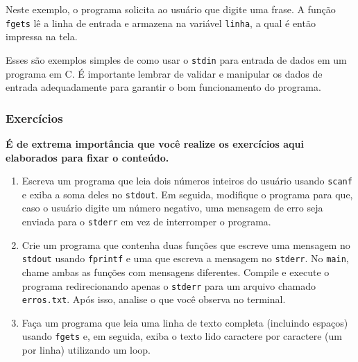Neste exemplo, o programa solicita ao usuário que digite uma frase. A função 
\texttt{fgets} lê a linha de entrada e armazena na variável \texttt{linha}, 
a qual é então impressa na tela.

Esses são exemplos simples de como usar o \texttt{stdin} para entrada de dados 
em um programa em C. É importante lembrar de validar e manipular os dados de 
entrada adequadamente para garantir o bom funcionamento do programa.

\subsubsection{Exercícios}

\textbf{É de extrema importância que você realize os exercícios aqui elaborados para fixar o conteúdo.}

\begin{enumerate}
    \item {Escreva um programa que leia dois números inteiros do usuário usando 
        \texttt{scanf} e exiba a soma deles no \texttt{stdout}. Em seguida, 
        modifique o programa para que, caso o usuário digite um número negativo, 
        uma mensagem de erro seja enviada para o \texttt{stderr} em vez de 
        interromper o programa.}
    \item {Crie um programa que contenha duas funções que escreve uma mensagem 
        no \texttt{stdout} usando \texttt{fprintf} e uma que escreva a mensagem 
        no \texttt{stderr}. No \texttt{main}, chame ambas as funções com mensagens 
        diferentes. Compile e execute o programa redirecionando apenas o 
        \texttt{stderr} para um arquivo chamado \texttt{erros.txt}. Após isso, 
        analise o que você observa no terminal.}
    \item {Faça um programa que leia uma linha de texto completa (incluindo 
        espaços) usando \texttt{fgets} e, em seguida, exiba o texto lido caractere 
        por caractere (um por linha) utilizando um loop.}
\end{enumerate}

